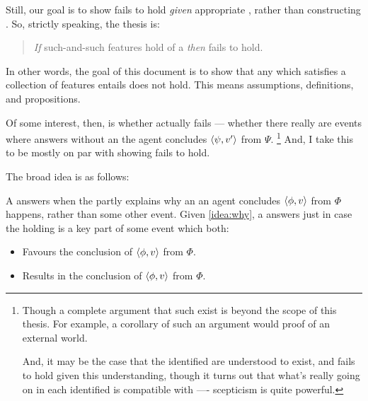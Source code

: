 \begin{note}
  Still, our goal is to show \issueInclusion{} fails to hold \emph{given} appropriate , rather than constructing .
  So, strictly speaking, the thesis is:
  \begin{quote}
    \emph{If} such-and-such features hold of a \scen{} \emph{then} \issueInclusion{} fails to hold.
  \end{quote}
  In other words, the goal of this document is to show that any  which satisfies a collection of features entails \issueInclusion{} does not hold.
  This means assumptions, definitions, and propositions.

  Of some interest, then, is whether \issueInclusion{} actually fails --- whether there really are events where  answers \qWhy{} without an  the agent concludes \(\langle\psi, v'\rangle\) from \(\Psi\).%
  \footnote{
    Though a complete argument that such  exist is beyond the scope of this thesis.
    For example, a corollary of such an argument would proof of an external world.

    And, it may be the case that the  identified are understood to exist, and \issueInclusion{} fails to hold given this understanding, though it turns out that what's really going on in each  identified is compatible with \issueInclusion{} ---- scepticism is quite powerful.
  }
  And, I take this to be mostly on par with showing \issueInclusion{} fails to hold.
\end{note}


\begin{note}
  The broad idea is as follows:

  A \fingfr{} answers \qWhy{} when the \fingfr{} partly explains why an  an agent concludes \(\langle\phi, v\rangle\) from \(\Phi\) happens, rather than some other event.
  Given \autoref{idea:why}, a \fingfr{} answers \qWhy{} just in case the \fingfr{} holding is a key part of some event which both:
  \begin{itemize}
  \item
    Favours the \agents{} conclusion of \(\langle\phi, v\rangle\) from \(\Phi\).
  \item
    Results in the \agents{} conclusion of \(\langle\phi, v\rangle\) from \(\Phi\).
  \end{itemize}
\end{note}


